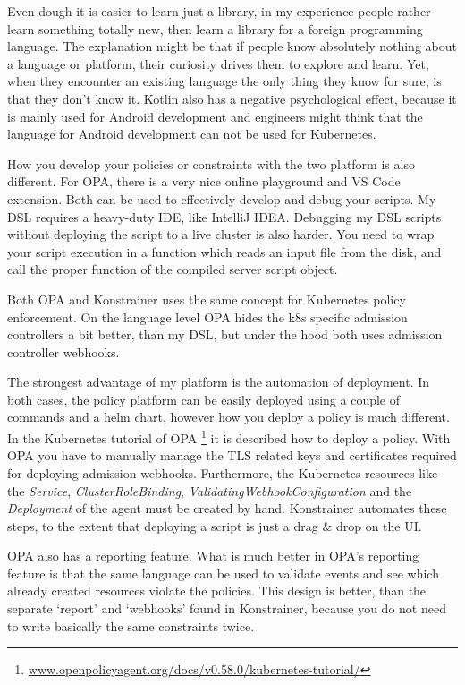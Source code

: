 Even dough it is easier to learn just a library, in my experience people rather learn something totally new, then learn a library for a foreign programming language. The explanation might be that if people know absolutely nothing about a language or platform, their curiosity drives them to explore and learn. Yet, when they encounter an existing language the only thing they know for sure, is that they don't know it. Kotlin also has a negative psychological effect, because it is mainly used for Android development and engineers might think that the language for Android development can not be used for Kubernetes.

How you develop your policies or constraints with the two platform is also different. For OPA, there is a very nice online playground and VS Code extension. Both can be used to effectively develop and debug your scripts. My DSL requires a heavy-duty IDE, like IntelliJ IDEA. Debugging my DSL scripts without deploying the script to a live cluster is also harder. You need to wrap your script execution in a function which reads an input file from the disk, and call the proper function of the compiled server script object.

Both OPA and Konstrainer uses the same concept for Kubernetes policy enforcement. On the language level OPA hides the k8s specific admission controllers a bit better, than my DSL, but under the hood both uses admission controller webhooks.

The strongest advantage of my platform is the automation of deployment. In both cases, the policy platform can be easily deployed using a couple of commands and a helm chart, however how you deploy a policy is much different. In the Kubernetes tutorial of OPA
\footnote{\url{www.openpolicyagent.org/docs/v0.58.0/kubernetes-tutorial/}} it is described how to deploy a policy. With OPA you have to manually manage the TLS related keys and certificates required for deploying admission webhooks. Furthermore, the Kubernetes resources like the \emph{Service}, \emph{ClusterRoleBinding}, \emph{ValidatingWebhookConfiguration} and the \emph{Deployment} of the agent must be created by hand. Konstrainer automates these steps, to the extent that deploying a script is just a drag \& drop on the UI.

OPA also has a reporting feature. What is much better in OPA's reporting feature is that the same language can be used to validate events and see which already created resources violate the policies. This design is better, than the separate `report' and `webhooks' found in Konstrainer, because you do not need to write basically the same constraints twice.

